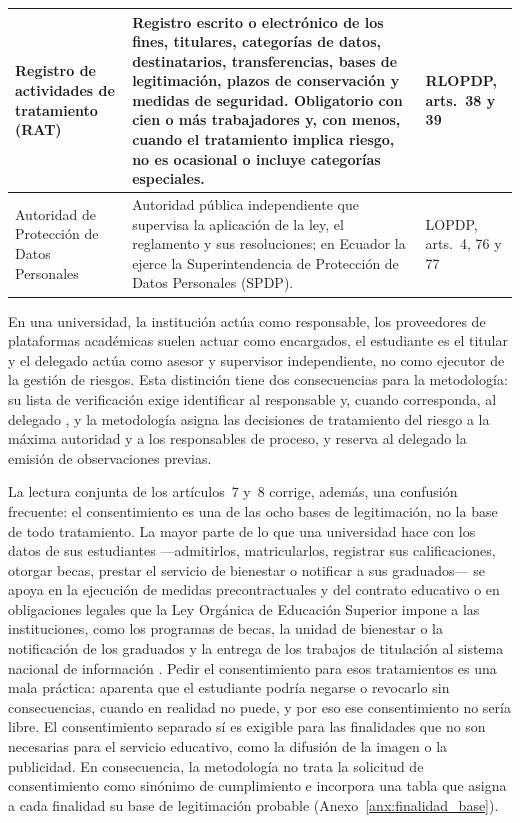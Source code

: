 {\begin{xltabular}{\textwidth}{|>{\raggedright\arraybackslash}p{3.2cm}|L|>{\raggedright\arraybackslash}p{2.6cm}|}
  \hline
  Registro de actividades de tratamiento (RAT) & Registro escrito o electrónico de los fines, titulares, categorías de datos, destinatarios, transferencias, bases de legitimación, plazos de conservación y medidas de seguridad. Obligatorio con cien o más trabajadores y, con menos, cuando el tratamiento implica riesgo, no es ocasional o incluye categorías especiales. & RLOPDP, arts.~38 y 39 \\
  \hline
  Autoridad de Protección de Datos Personales & Autoridad pública independiente que supervisa la aplicación de la ley, el reglamento y sus resoluciones; en Ecuador la ejerce la Superintendencia de Protección de Datos Personales (SPDP). & LOPDP, arts.~4, 76 y 77 \\
\end{xltabular}
}
\vspace{-6pt}
{\raggedright
{}
\par}

En una universidad, la institución actúa como responsable, los proveedores de plataformas académicas suelen actuar como encargados, el estudiante es el titular y el delegado actúa como asesor y supervisor independiente, no como ejecutor de la gestión de riesgos. Esta distinción tiene dos consecuencias para la metodología: su lista de verificación exige identificar al responsable y, cuando corresponda, al delegado \cite[art.~12, nums.~8 y 9]{lopdp2021}, y la metodología asigna las decisiones de tratamiento del riesgo a la máxima autoridad y a los responsables de proceso, y reserva al delegado la emisión de observaciones previas.

La lectura conjunta de los artículos~7 y~8 corrige, además, una confusión frecuente: el consentimiento es una de las ocho bases de legitimación, no la base de todo tratamiento. La mayor parte de lo que una universidad hace con los datos de sus estudiantes ---admitirlos, matricularlos, registrar sus calificaciones, otorgar becas, prestar el servicio de bienestar o notificar a sus graduados--- se apoya en la ejecución de medidas precontractuales y del contrato educativo \cite[art.~7, num.~5]{lopdp2021} o en obligaciones legales que la Ley Orgánica de Educación Superior impone a las instituciones, como los programas de becas, la unidad de bienestar o la notificación de los graduados y la entrega de los trabajos de titulación al sistema nacional de información \cite[arts.~77, 86, 129 y 144]{loes2010}. Pedir el consentimiento para esos tratamientos es una mala práctica: aparenta que el estudiante podría negarse o revocarlo sin consecuencias, cuando en realidad no puede, y por eso ese consentimiento no sería libre. El consentimiento separado sí es exigible para las finalidades que no son necesarias para el servicio educativo, como la difusión de la imagen o la publicidad. En consecuencia, la metodología no trata la solicitud de consentimiento como sinónimo de cumplimiento e incorpora una tabla que asigna a cada finalidad su base de legitimación probable (Anexo~\ref{anx:finalidad_base}).

